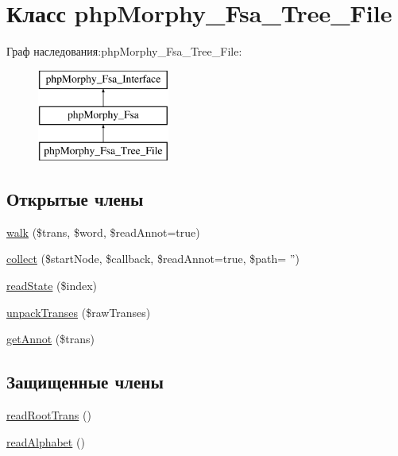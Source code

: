\hypertarget{classphpMorphy__Fsa__Tree__File}{
\section{Класс phpMorphy\_\-Fsa\_\-Tree\_\-File}
\label{classphpMorphy__Fsa__Tree__File}
}
Граф наследования:phpMorphy\_\-Fsa\_\-Tree\_\-File:\begin{figure}[H]
\begin{center}
\leavevmode
\includegraphics[height=3.000000cm]{classphpMorphy__Fsa__Tree__File}
\end{center}
\end{figure}
\subsection*{Открытые члены}
\begin{DoxyCompactItemize}
\item 
\hyperlink{classphpMorphy__Fsa__Tree__File_ab82328d726f4474c070fefb7ee342601}{walk} (\$trans, \$word, \$readAnnot=true)
\item 
\hyperlink{classphpMorphy__Fsa__Tree__File_ae27a6fa7a58dd2f2729669f770becd7b}{collect} (\$startNode, \$callback, \$readAnnot=true, \$path= '')
\item 
\hyperlink{classphpMorphy__Fsa__Tree__File_a02c64d8cfc4b5c4cbd936e61bdfcf0b0}{readState} (\$index)
\item 
\hyperlink{classphpMorphy__Fsa__Tree__File_accf424d1903ca14e71c155172c19c39d}{unpackTranses} (\$rawTranses)
\item 
\hyperlink{classphpMorphy__Fsa__Tree__File_a1d4631049297d05fe5917f4cfba5bb67}{getAnnot} (\$trans)
\end{DoxyCompactItemize}
\subsection*{Защищенные члены}
\begin{DoxyCompactItemize}
\item 
\hyperlink{classphpMorphy__Fsa__Tree__File_afbaf674c1992e0f10fab8ccc730b5273}{readRootTrans} ()
\item 
\hyperlink{classphpMorphy__Fsa__Tree__File_aefe149508efbb5089c084a16a5851476}{readAlphabet} ()
\end{DoxyCompactItemize}


